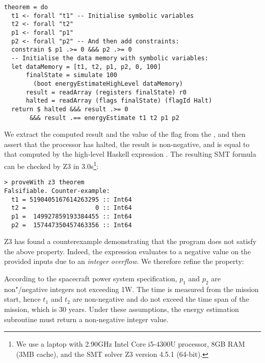 \begin{verbatim}
theorem = do
  t1 <- forall "t1" -- Initialise symbolic variables
  t2 <- forall "t2"
  p1 <- forall "p1"
  p2 <- forall "p2" -- And then add constraints:
  constrain $ p1 .>= 0 &&& p2 .>= 0
  -- Initialise the data memory with symbolic variables:
  let dataMemory = [t1, t2, p1, p2, 0, 100]
      finalState = simulate 100
        (boot energyEstimateHighLevel dataMemory)
      result = readArray (registers finalState) r0
      halted = readArray (flags finalState) (flagId Halt)
  return $ halted &&& result .>= 0
       &&& result .== energyEstimate t1 t2 p1 p2
\end{verbatim}

\noindent
We extract the computed result and the value of the flag  from the
, and then assert that the processor has halted, the result is
non-negative, and is equal to that computed by the high-level Haskell expression
.
The resulting SMT formula can be checked by Z3 in
3.0s\footnote{We use a laptop with 2.90GHz Intel Core i5-4300U processor, 8GB
RAM (3MB cache), and the SMT solver Z3 version 4.5.1 (64-bit).}:

\begin{verbatim}
> proveWith z3 theorem
Falsifiable. Counter-example:
  t1 = 5190405167614263295 :: Int64
  t2 =                   0 :: Int64
  p1 =  149927859193384455 :: Int64
  p2 =  157447350457463356 :: Int64
\end{verbatim}

\noindent
Z3 has found a counterexample demonstrating that the program does not
satisfy the above property. Indeed, the expression evaluates to a negative
value on the provided inputs due to an \emph{integer overflow}. We therefore
refine the property:

\begin{tcolorbox}
\vspace{-1mm}
According to the spacecraft power system specification, $p_1$ and $p_2$ are
non"/negative integers not exceeding 1W. The time is measured
from the mission start, hence $t_1$ and $t_2$ are non-negative and do not exceed
the time span of the mission, which is 30 years. Under these assumptions,
the energy estimation subroutine must return a non-negative integer value.
\vspace{-1mm}
\end{tcolorbox}

